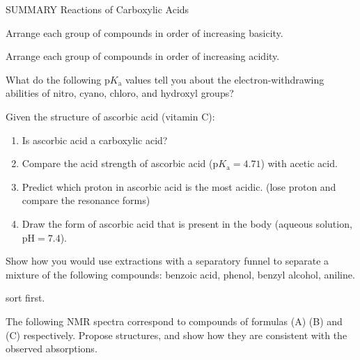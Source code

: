 SUMMARY Reactions of Carboxylic Acids

\begin{example} %
    Arrange each group of compounds in order of increasing basicity.
\end{example}

\begin{example} %
    Arrange each group of compounds in order of increasing acidity.
\end{example}

\begin{example} %
    What do the following $\mathrm{p}K_{\mathrm{a}}$ values tell you about the electron-withdrawing abilities of nitro, cyano, chloro, and hydroxyl groups?
\end{example}

\begin{example} %
    Given the structure of ascorbic acid (vitamin C):
    \begin{enumerate}[label=(\alph*)]
        \item Is ascorbic acid a carboxylic acid?
        \item Compare the acid strength of ascorbic acid ($\mathrm{p}K_{\mathrm{a}} = 4.71$) with acetic acid. 
        \item Predict which proton in ascorbic acid is the most acidic. (lose proton and compare the resonance forms)
        \item Draw the form of ascorbic acid that is present in the body (aqueous solution, $\mathrm{pH} = 7.4$).
    \end{enumerate}
\end{example}

\begin{example} %
    Show how you would use extractions with a separatory funnel to separate a mixture of the following compounds: benzoic  acid, phenol, benzyl alcohol, aniline.

    sort first.
\end{example}

\begin{example} %
    The following NMR spectra correspond to compounds of formulas (A) (B) and (C)  respectively. Propose structures, and show how they are consistent with the observed absorptions.
\end{example}
